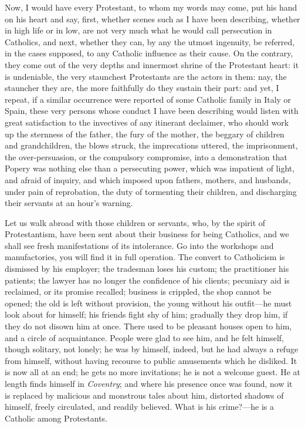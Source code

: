 Now, I would have every Protestant, to whom my words
may come, put his hand on his heart and say, first,
whether scenes such as I have been describing, whether in
high life or in low, are not very much what he would call
persecution in Catholics, and next, whether they can, by
any the utmost ingenuity, be referred, in the cases
supposed, to any Catholic influence as their cause. On
the contrary, they come out of the very depths and
innermost shrine of the Protestant heart: it is
undeniable, the very staunchest Protestants are the
actors in them: nay, the stauncher they are, the more
faithfully do they sustain their part: and yet, I repeat,
if a similar occurrence were reported of some Catholic
family in Italy or Spain, these very persons whose
conduct I have been describing would listen with great
satisfaction to the invectives of any itinerant
declaimer, who should work up the sternness of the
father, the fury of the mother, the beggary of children
and grandchildren, the blows struck, the imprecations
uttered, the imprisonment, the over-persuasion, or the
compulsory compromise, into a demonstration that Popery
was nothing else than a persecuting power, which was
impatient of light, and afraid of inquiry, and which
imposed upon fathers, mothers, and husbands, under pain
of reprobation, the duty of tormenting their children,
and discharging their servants at an hour's warning.

Let us walk abroad with those children or servants,
who, by the spirit of Protestantism, have been sent about
their business for being Catholics, and we shall see
fresh manifestations of its intolerance. Go into the
workshops and manufactories, you will find it in full
operation. The convert to Catholicism is dismissed by his
employer; the tradesman loses his custom; the
practitioner his patients; the lawyer has no longer the
confidence of his clients; pecuniary aid is reclaimed, or
its promise recalled; business is crippled, the shop
cannot be opened; the old is left without provision, the
young without his outfit—he must look about for
himself; his friends fight shy of him; gradually they
drop him, if they do not disown him at once. There used
to be pleasant houses open to him, and a circle of
acquaintance. People were glad to see him, and he felt
himself, though solitary, not lonely; he was by himself,
indeed, but he had always a refuge from himself, without
having recourse to public amusements which he disliked.
It is now all at an end; he gets no more invitations; he
is not a welcome guest. He at length finds himself in \emph{Coventry};
and where his presence once was found, now it is replaced
by malicious and monstrous tales about him, distorted
shadows of himself, freely circulated, and readily
believed. What is his crime?—he is a Catholic among
Protestants.

